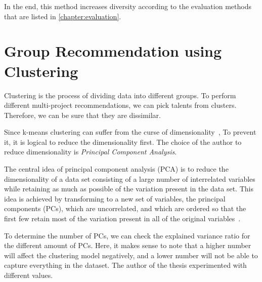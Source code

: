 In the end, this method increases diversity according to the evaluation methods that are listed in \autoref{chapter:evaluation}.

\section{Group Recommendation using Clustering}

Clustering is the process of dividing data into different groups. To perform different multi-project recommendations, we can pick talents from clusters. Therefore, we can be sure that they are dissimilar. 

Since k-means clustering can suffer from the curse of dimensionality~\parencite{steinbach2004challenges}, To prevent it, it is logical to reduce the dimensionality first. The choice of the author to reduce dimensionality is \textit{Principal Component Analysis}.

The central idea of principal component analysis (PCA) is to reduce the
dimensionality of a data set consisting of a large number of interrelated
variables while retaining as much as possible of the variation present in
the data set. This idea is achieved by transforming to a new set of variables,
the principal components (PCs), which are uncorrelated, and which are
ordered so that the first few retain most of the variation present in all of
the original variables~\parencite{jolliffe2011principal}. 


To determine the number of PCs, we can check the explained variance ratio for the different amount of PCs. Here, it makes sense to note that a higher number will affect the clustering model negatively, and a lower number will not be able to capture everything in the dataset. The author of the thesis experimented with different values.

